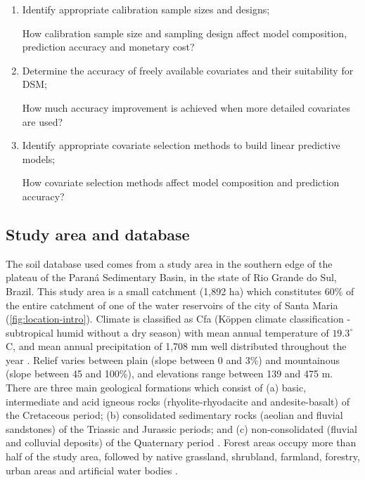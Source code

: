 \begin{enumerate}
  \item Identify appropriate calibration sample sizes and designs;

   How calibration sample size and sampling 
  design affect model composition, prediction accuracy and monetary cost?

  \item Determine the accuracy of freely available covariates and their 
  suitability for DSM;

   How much accuracy improvement is achieved 
  when more detailed covariates are used?

  \item Identify appropriate covariate selection methods to build linear 
  predictive models;

   How covariate selection methods affect model 
  composition and prediction accuracy?
\end{enumerate}

\subsection{Study area and database}

The soil database used comes from a study area in the southern edge of the 
plateau of the Paraná Sedimentary Basin, in the state of Rio Grande do Sul, 
Brazil. This study area is a small catchment (1,892 ha) which constitutes 60\% 
of the entire catchment of one of the water reservoirs of the city of Santa 
Maria (\ref{fig:location-intro}). Climate is classified as Cfa (Köppen climate 
classification - subtropical humid without a dry season) with mean annual 
temperature of $19.3^{\circ}$C, and mean annual precipitation of 1,708 mm well 
distributed throughout the year \cite{Maluf2000}. Relief varies between plain 
(slope between 0 and 3\%) and mountainous (slope between 45 and 100\%), and 
elevations range between 139 and 475 m. There are three main geological 
formations which consist of (a) basic, intermediate and acid igneous rocks 
(rhyolite-rhyodacite and andesite-basalt) of the Cretaceous period; (b) 
consolidated sedimentary rocks (aeolian and fluvial sandstones) of the Triassic
and Jurassic periods; and (c) non-consolidated (fluvial and colluvial deposits)
of the Quaternary period \cite{GasparettoEtAl1988, MacielFilho1990, Sartori2009}.
Forest areas occupy more than half of the study area, followed by native 
grassland, shrubland, farmland, forestry, urban areas and artificial water 
bodies \cite{SamuelRosaEtAl2011a}.

